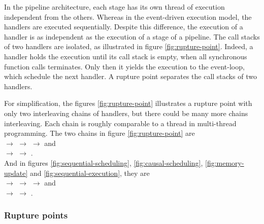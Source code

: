 
In the pipeline architecture, each stage has its own thread of execution independent from the others.
Whereas in the event-driven execution model, the handlers are executed sequentially.
Despite this difference, the execution of a handler is as independent as the execution of a stage of a pipeline.
The call stacks of two handlers are isolated, as illustrated in figure \ref{fig:rupture-point}.
Indeed, a handler holds the execution until its call stack is empty, when all synchronous function calls terminates. Only then it yields the execution to the event-loop, which schedule the next handler.
A rupture point separates the call stacks of two handlers.

For simplification, the figures \ref{fig:rupture-point} illustrates a rupture point with only two interleaving chains of handlers, but there could be many more chains interleaving.
Each chain is roughly comparable to a thread in multi-thread programming.
The two chains in figure \ref{fig:rupture-point} are \\
$\to$
 $\to$
 $\to$ and \\
\dotcircled{\textcolor{white}{0}} $\to$
\dotcircled{\textcolor{white}{0}} $\to$
\dotcircled{\textcolor{white}{0}}.\\
And in figures \ref{fig:sequential-scheduling},  \ref{fig:causal-scheduling}, \ref{fig:memory-update} and \ref{fig:sequential-execution}, they are \\
$\to$
 $\to$
 $\to$ and \\
\dotcircled{\textcolor{white}{0}} $\to$
 $\to$
\dotcircled{\textcolor{white}{0}}.

\subsubsection{Rupture points} \label{chapter5:flx-compiler:analyzer:rupture}

